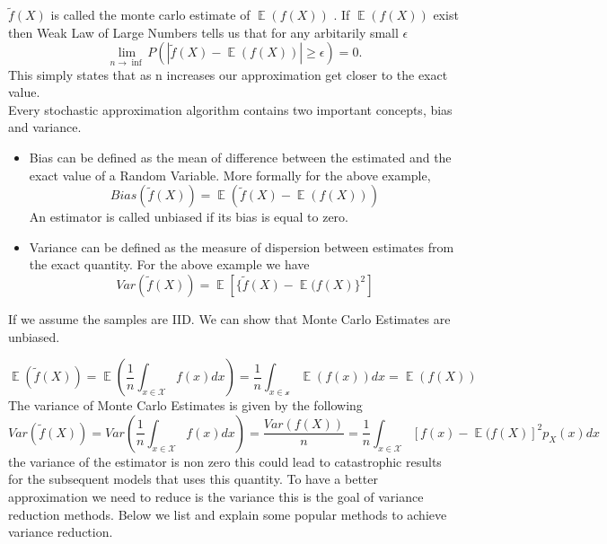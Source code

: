 \documentclass[a4paper,twoside]{iiththesis}
\theoremstyle{definition}
\theoremstyle{definition}
\theoremstyle{remark}
\DeclareMathOperator*{\E}{\mathop{\mathbb{E}}}
\begin{document}
$\widetilde{f}(X)$ is called the monte carlo estimate of $\E (f(X))$ . If $\E (f(X))$ exist then Weak Law of Large Numbers tells us that for any arbitarily small $\epsilon$
\begin{equation}
	 \lim_{n\rightarrow \inf} P (|\widetilde{f}(X)  - \E (f(X))| \geq \epsilon)=0.
\end{equation}
This simply states that as n increases our approximation get closer to the exact value. \\
Every stochastic approximation algorithm contains two important concepts, bias and variance. 
\begin{itemize}
\item Bias can be defined as the mean of difference between the estimated and the exact value of a Random Variable. 
More formally for the above example, 
\begin{equation}
	Bias(\widetilde{f}(X)) = \E (\widetilde{f}(X) - \E (f(X)))
\end{equation}
An estimator is called unbiased if its bias is equal to zero.
\\
\item Variance can be defined as the measure of dispersion between estimates from the exact quantity. For the above example we have 
\begin{equation}
	Var (\widetilde{f}(X)) = \E [\{\widetilde{f}(X) - \E (f(X)\}^2]
\end{equation}
\end{itemize}
\newtheorem{lemma}[theorem]{Lemma}
If we assume the samples are IID. We can show that Monte Carlo Estimates are unbiased.

\begin{equation}
	\E (\tilde{f}(X)) = \E \left(\frac{1}{n} \int_{x\in \mathcal{X}} f(x) dx\right) = \frac{1}{n} \int_{x \in \mathcal{x}} \E (f(x)) dx= \E (f(X)) 
    \end{equation}
The variance of Monte Carlo Estimates is given by the following 
\begin{equation}
Var(\tilde{f}(X)) = Var\left(\frac{1}{n}\int_{x \in \mathcal{X}} f(x) dx\right) = \frac{Var(f(X))}{n} = \frac{1}{n} \int_{x\in\mathcal{X}} [f(x) - \E (f(X)]^2 p_{X}(x) dx
\end{equation}
the variance of the estimator is non zero this could lead to catastrophic results for the subsequent models that uses this quantity. To have a better approximation we need to reduce is the variance this is the goal of variance reduction methods. Below we list and explain some popular methods to achieve variance reduction.
\end{document}

